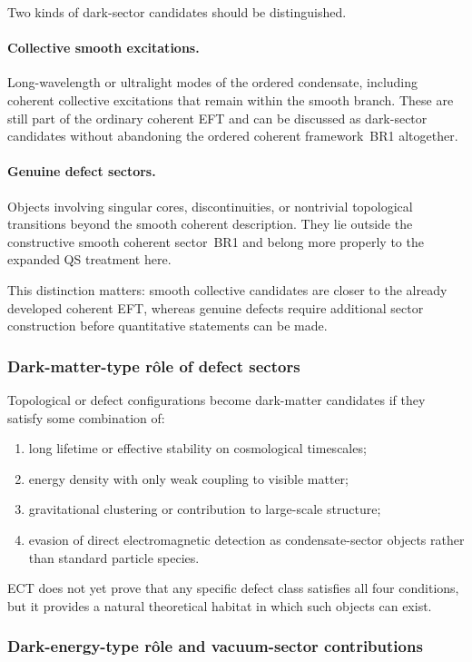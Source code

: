 \documentclass[11pt,a4paper]{article}
\numberwithin{equation}{section}
\begin{document}
Two kinds of dark-sector candidates should be distinguished.

\paragraph{Collective smooth excitations.}
Long-wavelength or ultralight modes of the ordered condensate, including
coherent collective excitations that remain within the smooth branch.
These are still part of the ordinary coherent EFT and can be discussed
as dark-sector candidates without abandoning the ordered coherent framework~BR1 altogether.

\paragraph{Genuine defect sectors.}
Objects involving singular cores, discontinuities, or nontrivial
topological transitions beyond the smooth coherent description.
They lie outside the constructive smooth coherent sector~BR1 and belong more properly
to the expanded QS treatment here.

This distinction matters: smooth collective candidates are closer to
the already developed coherent EFT, whereas genuine defects require
additional sector construction before quantitative statements can be made.

\subsubsection*{Dark-matter-type r\^ole of defect sectors}

Topological or defect configurations become dark-matter candidates if
they satisfy some combination of:
\begin{enumerate}[label=(\roman*)]
  \item long lifetime or effective stability on cosmological timescales;
  \item energy density with only weak coupling to visible matter;
  \item gravitational clustering or contribution to large-scale
    structure;
  \item evasion of direct electromagnetic detection as condensate-sector
    objects rather than standard particle species.
\end{enumerate}
ECT does not yet prove that any specific defect class satisfies all
four conditions, but it provides a natural theoretical habitat in which
such objects can exist.

\subsubsection*{Dark-energy-type r\^ole and vacuum-sector contributions}
\end{document}
